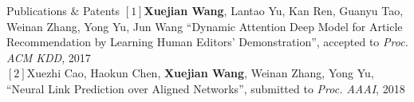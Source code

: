 \documentclass{resume} %
\begin{document}
\begin{rSection}{Publications $\&$ Patents}
$[1]$\textbf{Xuejian Wang}, Lantao Yu, Kan Ren, Guanyu Tao, Weinan Zhang, Yong Yu, Jun Wang ``Dynamic Attention Deep Model for Article Recommendation by Learning Human Editors’ Demonstration'', accepted to  \emph{Proc. ACM KDD}, 2017\\
$[2]$Xuezhi Cao, Haokun Chen, \textbf{Xuejian Wang}, Weinan Zhang, Yong Yu, ``Neural Link Prediction over Aligned Networks'', submitted to  \emph{Proc. AAAI}, 2018\\
\end{rSection}
\end{document}
